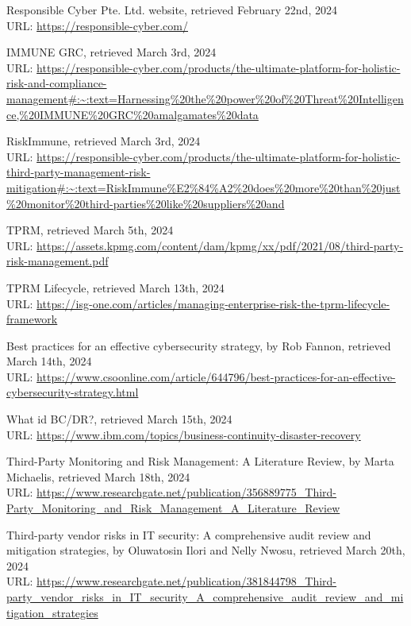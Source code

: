 \adjustmtc
\newpage
\renewcommand\bibname{Références}
\begin{thebibliography}{9}
\thispagestyle{MyStyle}

Responsible Cyber Pte. Ltd. website, retrieved February 22nd, 2024 \\
URL: \url{https://responsible-cyber.com/}

IMMUNE GRC, retrieved March 3rd, 2024 \\
URL: \url{https://responsible-cyber.com/products/the-ultimate-platform-for-holistic-risk-and-compliance-management#:~:text=Harnessing%20the%20power%20of%20Threat%20Intelligence,%20IMMUNE%20GRC%20amalgamates%20data}

RiskImmune, retrieved March 3rd, 2024 \\
URL: \url{https://responsible-cyber.com/products/the-ultimate-platform-for-holistic-third-party-management-risk-mitigation#:~:text=RiskImmune%E2%84%A2%20does%20more%20than%20just%20monitor%20third-parties%20like%20suppliers%20and}


TPRM, retrieved March 5th, 2024  \\
URL: \url{https://assets.kpmg.com/content/dam/kpmg/xx/pdf/2021/08/third-party-risk-management.pdf}


TPRM Lifecycle, retrieved March 13th, 2024 \\
URL: \url{https://isg-one.com/articles/managing-enterprise-risk-the-tprm-lifecycle-framework}

Best practices for an effective cybersecurity strategy, by Rob Fannon, retrieved March 14th, 2024 \\
URL: \url{https://www.csoonline.com/article/644796/best-practices-for-an-effective-cybersecurity-strategy.html}

What id BC/DR?, retrieved March 15th, 2024 \\
URL: \url{https://www.ibm.com/topics/business-continuity-disaster-recovery}


Third-Party Monitoring and Risk Management: A Literature Review, by Marta Michaelis, retrieved March 18th, 2024 \\
URL: \url{https://www.researchgate.net/publication/356889775_Third-Party_Monitoring_and_Risk_Management_A_Literature_Review}

Third-party vendor risks in IT security: A comprehensive audit review and mitigation strategies, by Oluwatosin Ilori and Nelly Nwosu, retrieved March 20th, 2024 \\
URL: \url{https://www.researchgate.net/publication/381844798_Third-party_vendor_risks_in_IT_security_A_comprehensive_audit_review_and_mitigation_strategies}


\end{thebibliography}
